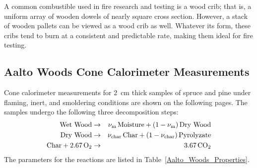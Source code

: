 A common combustible used in fire research and testing is a wood crib; that is, a uniform array of wooden dowels of nearly square cross section. However, a stack of wooden pallets can be viewed as a wood crib as well. Whatever its form, these cribs tend to burn at a consistent and predictable rate, making them ideal for fire testing.

\newpage

\subsection{Aalto Woods Cone Calorimeter Measurements}
\label{Aalto_Woods_HRRPUA}

Cone calorimeter measurements for 2~cm thick samples of spruce and pine under flaming, inert, and smoldering conditions are shown on the following pages. The samples undergo the following three decomposition steps:
\begin{eqnarray}
   \hbox{Wet Wood} &\to& \nu_{\rm m} \, \hbox{Moisture} + (1-\nu_{\rm m}) \, \hbox{Dry Wood} \\
   \hbox{Dry Wood} &\to& \nu_{\rm char} \, \hbox{Char} + (1-\nu_{\rm char}) \, \hbox{Pyrolyzate} \\
   \hbox{Char} + 2.67 \, \hbox{O}_2 &\to& 3.67 \, \hbox{CO}_2
\end{eqnarray}
The parameters for the reactions are listed in Table~\ref{Aalto_Woods_Properties}.

